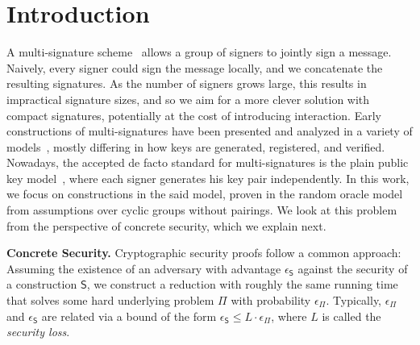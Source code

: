 \documentclass[version=final]{iacrcc}
\theoremstyle{mytheorem}				\newtheorem{theorem}{Theorem}
\theoremstyle{myplain}
\theoremstyle{mydefinition}
\theoremstyle{myremark}
\begin{document}
\section{Introduction}
A multi-signature scheme~\cite{itakura1983public,CCS:BelNev06} allows a group of signers to jointly sign a message.
Naively, every signer could sign the message locally, and we concatenate the resulting signatures.
As the number of signers grows large, this results in impractical signature sizes, and so we aim for a more clever solution with compact signatures, potentially at the cost of introducing interaction.
Early constructions of multi-signatures have been presented and analyzed in a variety of models~\cite{CCS:MicOhtRey01,PKC:Boldyreva03,EC:LOSSW06,SP:DEFKLNS19,EPRINT:CriKomMal21}, mostly differing in how keys are generated, registered, and verified.
Nowadays, the accepted de facto standard for multi-signatures is the plain public key model~\cite{CCS:BelNev06}, where each signer generates his key pair independently.
In this work, we focus on constructions in the said model, proven in the random oracle model~\cite{CCS:BelRog93} from assumptions over cyclic groups without pairings.
We look at this problem from the perspective of concrete security, which we explain next.

\smallskip\noindent\textbf{Concrete Security.} 
Cryptographic security proofs follow a common approach: 
Assuming the existence of an adversary with advantage $\epsilon_{\mathsf{S}}$ against the security of a construction ${\mathsf{S}}$, we construct a reduction with roughly the same running time that solves some hard underlying problem $\Pi$ with probability $\epsilon_\Pi$.
Typically, $\epsilon_\Pi$ and $\epsilon_{\mathsf{S}}$ are related via a bound of the form $\epsilon_{\mathsf{S}} \leq L\cdot \epsilon_\Pi$, where $L$ is called the \emph{security loss}.
\end{document}
